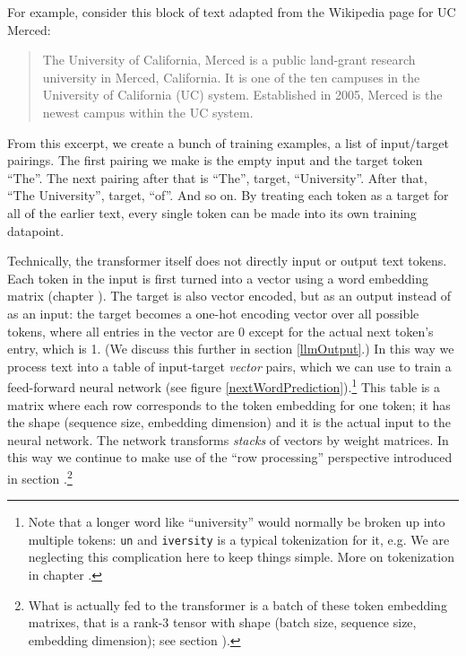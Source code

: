 For example, consider this block of text adapted from the Wikipedia page for UC
Merced:

\begin{quote}
The University of California, Merced is a public land-grant research university
in Merced, California. It is one of the ten campuses in the University of
California (UC) system. Established in 2005, Merced is the newest campus within
the UC system.
\end{quote}

From this excerpt, we create a bunch of training examples, a list of
input/target pairings. The first pairing we make is the empty input and the
target token ``The''. The next pairing after that is ``The'', target,
``University''. After that, ``The University'', target, ``of''. And so on. By
treating each token as a target for all of the earlier text, every single token
can be made into its own training datapoint.

Technically, the transformer itself does not directly input or output text
tokens. Each token in the input is first turned into a vector using a word
embedding matrix (chapter ). The target is also
vector encoded, but as an output instead of as an input: the target becomes a
one-hot encoding vector over all possible tokens, where all entries in the
vector are 0 except for the actual next token's entry, which is 1. (We discuss
this further in section \ref{llmOutput}.) In this way we process text into a
table of input-target \emph{vector} pairs, which we can use to train a
feed-forward neural network (see figure
\ref{nextWordPrediction}).\footnote{Note that a longer word like ``university''
would normally be broken up into multiple tokens: \texttt{un} and
\texttt{iversity} is a typical tokenization for it, e.g. We are neglecting this
complication here to keep things simple. More on tokenization in chapter
.} This table is a matrix where each row corresponds
to the token embedding for one token; it has the shape (sequence size,
embedding dimension) and it is the actual input to the neural network. The network transforms \emph{stacks} of vectors by
weight matrices. In this way we continue to make use of the ``row processing'' perspective introduced in section .\footnote{What is actually fed to the transformer is a batch of these
token embedding matrixes, that is a rank-3 tensor with shape (batch size,
sequence size, embedding dimension); see section ).}

